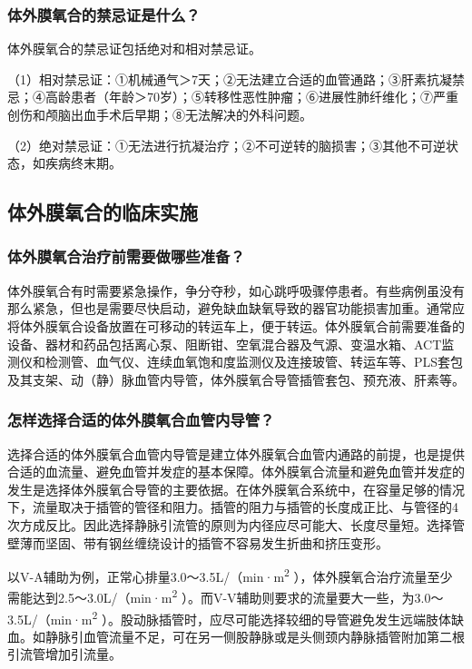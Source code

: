 \subsubsection{体外膜氧合的禁忌证是什么？}

体外膜氧合的禁忌证包括绝对和相对禁忌证。

（1）相对禁忌证：①机械通气＞7天；②无法建立合适的血管通路；③肝素抗凝禁忌；④高龄患者（年龄＞70岁）；⑤转移性恶性肿瘤；⑥进展性肺纤维化；⑦严重创伤和颅脑出血手术后早期；⑧无法解决的外科问题。

（2）绝对禁忌证：①无法进行抗凝治疗；②不可逆转的脑损害；③其他不可逆状态，如疾病终末期。

\subsection{体外膜氧合的临床实施}

\subsubsection{体外膜氧合治疗前需要做哪些准备？}

体外膜氧合有时需要紧急操作，争分夺秒，如心跳呼吸骤停患者。有些病例虽没有那么紧急，但也是需要尽快启动，避免缺血缺氧导致的器官功能损害加重。通常应将体外膜氧合设备放置在可移动的转运车上，便于转运。体外膜氧合前需要准备的设备、器材和药品包括离心泵、阻断钳、空氧混合器及气源、变温水箱、ACT监测仪和检测管、血气仪、连续血氧饱和度监测仪及连接玻管、转运车等、PLS套包及其支架、动（静）脉血管内导管，体外膜氧合导管插管套包、预充液、肝素等。

\subsubsection{怎样选择合适的体外膜氧合血管内导管？}

选择合适的体外膜氧合血管内导管是建立体外膜氧合血管内通路的前提，也是提供合适的血流量、避免血管并发症的基本保障。体外膜氧合流量和避免血管并发症的发生是选择体外膜氧合导管的主要依据。在体外膜氧合系统中，在容量足够的情况下，流量取决于插管的管径和阻力。插管的阻力与插管的长度成正比、与管径的4次方成反比。因此选择静脉引流管的原则为内径应尽可能大、长度尽量短。选择管壁薄而坚固、带有钢丝缠绕设计的插管不容易发生折曲和挤压变形。

以V-A辅助为例，正常心排量3.0～3.5L/（min·m\textsuperscript{2}
），体外膜氧合治疗流量至少需能达到2.5～3.0L/（min·m\textsuperscript{2}
）。而V-V辅助则要求的流量要大一些，为3.0～3.5L/（min·m\textsuperscript{2}
）。股动脉插管时，应尽可能选择较细的导管避免发生远端肢体缺血。如静脉引血管流量不足，可在另一侧股静脉或是头侧颈内静脉插管附加第二根引流管增加引流量。

